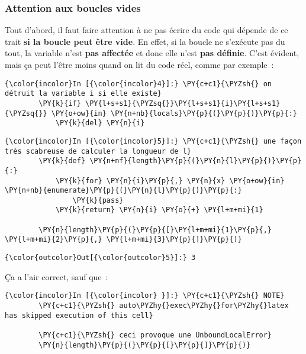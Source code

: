     \hypertarget{attention-aux-boucles-vides}{%
\subsubsection{Attention aux boucles
vides}\label{attention-aux-boucles-vides}}

    Tout d'abord, il faut faire attention à ne pas écrire du code qui
dépende de ce trait \textbf{si la boucle peut être vide}. En effet, si
la boucle ne s'exécute pas du tout, la variable n'est \textbf{pas
affectée} et donc elle n'est \textbf{pas définie}. C'est évident, mais
ça peut l'être moins quand on lit du code réel, comme par exemple~:

    \begin{Verbatim}[commandchars=\\\{\},frame=single,framerule=0.3mm,rulecolor=\color{cellframecolor}]
{\color{incolor}In [{\color{incolor}4}]:} \PY{c+c1}{\PYZsh{} on détruit la variable i si elle existe}
        \PY{k}{if} \PY{l+s+s1}{\PYZsq{}}\PY{l+s+s1}{i}\PY{l+s+s1}{\PYZsq{}} \PY{o+ow}{in} \PY{n+nb}{locals}\PY{p}{(}\PY{p}{)}\PY{p}{:} 
            \PY{k}{del} \PY{n}{i}
\end{Verbatim}


    \begin{Verbatim}[commandchars=\\\{\},frame=single,framerule=0.3mm,rulecolor=\color{cellframecolor}]
{\color{incolor}In [{\color{incolor}5}]:} \PY{c+c1}{\PYZsh{} une façon très scabreuse de calculer la longueur de l}
        \PY{k}{def} \PY{n+nf}{length}\PY{p}{(}\PY{n}{l}\PY{p}{)}\PY{p}{:}
            \PY{k}{for} \PY{n}{i}\PY{p}{,} \PY{n}{x} \PY{o+ow}{in} \PY{n+nb}{enumerate}\PY{p}{(}\PY{n}{l}\PY{p}{)}\PY{p}{:}
                \PY{k}{pass}
            \PY{k}{return} \PY{n}{i} \PY{o}{+} \PY{l+m+mi}{1}
        
        \PY{n}{length}\PY{p}{(}\PY{p}{[}\PY{l+m+mi}{1}\PY{p}{,} \PY{l+m+mi}{2}\PY{p}{,} \PY{l+m+mi}{3}\PY{p}{]}\PY{p}{)}
\end{Verbatim}


\begin{Verbatim}[commandchars=\\\{\},frame=single,framerule=0.3mm,rulecolor=\color{cellframecolor}]
{\color{outcolor}Out[{\color{outcolor}5}]:} 3
\end{Verbatim}
            
    Ça a l'air correct, sauf que~:

    \begin{Verbatim}[commandchars=\\\{\},frame=single,framerule=0.3mm,rulecolor=\color{cellframecolor}]
{\color{incolor}In [{\color{incolor} }]:} \PY{c+c1}{\PYZsh{} NOTE}
        \PY{c+c1}{\PYZsh{} auto\PYZhy{}exec\PYZhy{}for\PYZhy{}latex has skipped execution of this cell}
        
        \PY{c+c1}{\PYZsh{} ceci provoque une UnboundLocalError}
        \PY{n}{length}\PY{p}{(}\PY{p}{[}\PY{p}{]}\PY{p}{)}
\end{Verbatim}


